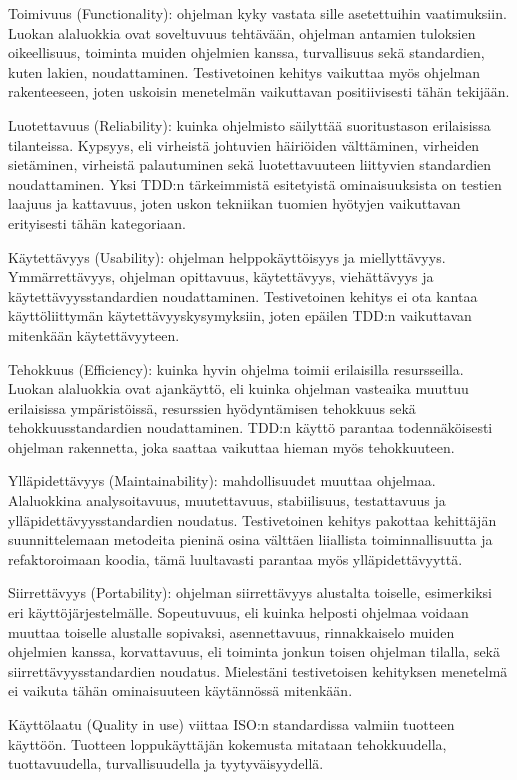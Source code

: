 \documentclass[finnish]{tktltiki2}
\theoremstyle{definition}
\theoremstyle{remark}
\begin{document}
Toimivuus (Functionality): ohjelman kyky vastata sille asetettuihin vaatimuksiin.  Luokan alaluokkia ovat soveltuvuus tehtävään, ohjelman antamien tuloksien oikeellisuus, toiminta muiden ohjelmien kanssa, turvallisuus sekä standardien, kuten lakien, noudattaminen. Testivetoinen kehitys vaikuttaa myös ohjelman rakenteeseen, joten uskoisin menetelmän vaikuttavan positiivisesti tähän tekijään.

Luotettavuus (Reliability): kuinka ohjelmisto säilyttää suoritustason erilaisissa tilanteissa. Kypsyys, eli virheistä johtuvien häiriöiden välttäminen, virheiden sietäminen, virheistä palautuminen sekä luotettavuuteen liittyvien standardien noudattaminen. Yksi TDD:n tärkeimmistä esitetyistä ominaisuuksista on testien laajuus ja kattavuus, joten uskon tekniikan tuomien hyötyjen vaikuttavan erityisesti tähän kategoriaan.

 Käytettävyys (Usability): ohjelman helppokäyttöisyys ja miellyttävyys. Ymmärrettävyys, ohjelman opittavuus, käytettävyys, viehättävyys ja käytettävyysstandardien noudattaminen. Testivetoinen kehitys ei ota kantaa käyttöliittymän käytettävyyskysymyksiin, joten epäilen TDD:n vaikuttavan mitenkään käytettävyyteen.

Tehokkuus (Efficiency): kuinka hyvin ohjelma toimii erilaisilla resursseilla. Luokan alaluokkia ovat ajankäyttö, eli kuinka ohjelman vasteaika muuttuu erilaisissa ympäristöissä, resurssien hyödyntämisen tehokkuus sekä tehokkuusstandardien noudattaminen. TDD:n käyttö parantaa todennäköisesti ohjelman rakennetta, joka saattaa vaikuttaa hieman myös tehokkuuteen.

Ylläpidettävyys (Maintainability): mahdollisuudet muuttaa ohjelmaa. Alaluokkina analysoitavuus, muutettavuus, stabiilisuus, testattavuus ja ylläpidettävyysstandardien noudatus. Testivetoinen kehitys pakottaa kehittäjän suunnittelemaan metodeita pieninä osina välttäen liiallista toiminnallisuutta ja refaktoroimaan koodia, tämä luultavasti parantaa myös ylläpidettävyyttä.

Siirrettävyys (Portability): ohjelman siirrettävyys alustalta toiselle, esimerkiksi eri käyttöjärjestelmälle. Sopeutuvuus, eli kuinka helposti ohjelmaa voidaan muuttaa toiselle alustalle sopivaksi, asennettavuus, rinnakkaiselo muiden ohjelmien kanssa, korvattavuus, eli toiminta jonkun toisen ohjelman tilalla, sekä siirrettävyysstandardien noudatus. Mielestäni testivetoisen kehityksen menetelmä ei vaikuta tähän ominaisuuteen käytännössä mitenkään.


Käyttölaatu (Quality in use) viittaa ISO:n standardissa valmiin tuotteen käyttöön. Tuotteen loppukäyttäjän kokemusta mitataan tehokkuudella, tuottavuudella, turvallisuudella ja tyytyväisyydellä.
\end{document}
